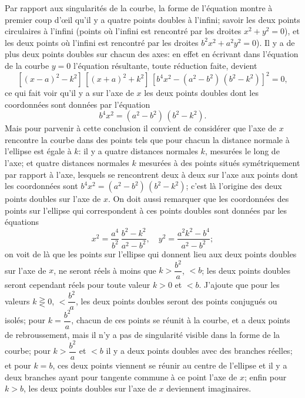\documentclass[11pt,a4paper]{article}
\theoremstyle{plain}
\theoremstyle{definition}
\begin{document}
Par rapport aux singularit\'{e}s de la courbe, la forme de l'\'{e}quation montre \`{a} premier coup d'\oe il qu'il y a quatre points doubles \`{a} l'infini; savoir les deux points circulaires \`{a} l'infini (points o\`{u} l'infini est rencontr\'{e} par les droites $x^2+y^2=0$), et les deux points o\`{u} l'infini est rencontr\'{e} par les droites $b^2x^2+a^2y^2=0$). Il y a de plus deux points doubles sur chacun des axes: en effet en \'{e}crivant dans l'\'{e}quation de la courbe $y=0$ l'\'{e}quation r\'{e}sultante, toute r\'{e}duction faite, devient
\[
[(x-a)^2-k^2]\,[(x+a)^2+k^2]\,[b^4x^2-(a^2-b^2)\,(b^2-k^2)]^2 = 0,
\]
ce qui fait voir qu'il y a sur l'axe de $x$ les deux points doubles dont les coordonn\'{e}es sont donn\'{e}es par l'\'{e}quation
\[
b^4x^2 = (a^2-b^2)\,(b^2-k^2).
\]
Mais pour parvenir \`{a} cette conclusion il convient de consid\'{e}rer que l'axe de $x$ rencontre la courbe dans des points tels que pour chacun la distance normale \`{a} l'ellipse est \'{e}gale \`{a} $k$: il y a quatre distances normales $k$, mesur\'{e}es le long de l'axe; et quatre distances normales $k$ mesur\'{e}es \`{a} des points situ\'{e}s sym\'{e}triquement par rapport \`{a} l'axe, lesquels se rencontrent deux \`{a} deux sur l'axe aux points dont les coordonn\'{e}es sont $b^4x^2 = (a^2-b^2)\,(b^2-k^2)$; c'est l\`{a} l'origine des deux points doubles sur l'axe de $x$. On doit aussi remarquer que les coordonn\'{e}es des points sur l'ellipse qui correspondent \`{a} ces points doubles sont donn\'{e}es par les \'{e}quations
\[
x^2 = \frac{a^4}{b^2}\,\frac{b^2-k^2}{a^2-b^2}, \quad y^2 = \frac{a^2k^2-b^4}{a^2-b^2};
\]
on voit de l\`{a} que les points sur l'ellipse qui donnent lieu aux deux points doubles sur l'axe de $x$, ne seront r\'{e}els \`{a} moins que $k > \dfrac{b^2}{a}$, $< b$; les deux points doubles seront cependant r\'{e}els pour toute valeur $k > 0$ et $< b$. J'ajoute que pour les valeurs $k \gtreqless 0$, $< \dfrac{b^2}{a}$, les deux points doubles seront des points conjugu\'{e}s ou isol\'{e}s; pour $k = \dfrac{b^2}{a}$, chacun de ces points se r\'{e}unit \`{a} la courbe, et a deux points de rebroussement, mais il n'y a pas de singularit\'{e} visible dans la forme de la courbe; pour $k > \dfrac{b^2}{a}$ et $< b$ il y a deux points doubles avec des branches r\'{e}elles; et pour $k = b$, ces deux points viennent se r\'{e}unir au centre de l'ellipse et il y a deux branches ayant pour tangente commune \`{a} ce point l'axe de $x$; enfin pour $k > b$, les deux points doubles sur l'axe de $x$ deviennent imaginaires.
\end{document}
